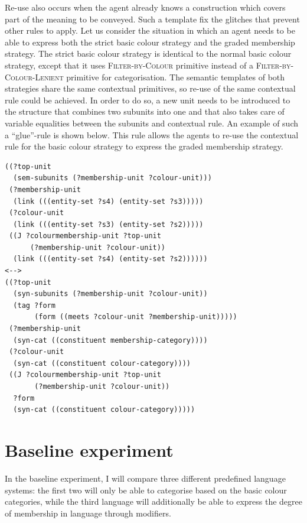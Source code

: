 Re-use also occurs when the agent already knows a construction which
covers part of the meaning to be conveyed. Such a template fix the
glitches that prevent other rules to apply. Let us consider the
situation in which an agent needs to be able to express both the
strict basic colour strategy and the graded membership
  strategy. The strict basic colour strategy is identical to the
normal basic colour strategy, except that it uses
\textsc{Filter-by-Colour} primitive instead of a
\textsc{Filter-by-Colour-Lenient} primitive for categorisation.  The
semantic templates of both strategies share the same contextual
primitives, so re-use of the same contextual rule could be achieved. In
order to do so, a new unit needs to be introduced to the structure
that combines two subunits into one and that also takes care of
variable equalities between the subunits and contextual rule. An
example of such a ``glue''-rule is shown below. This rule allows the
agents to re-use the contextual rule for the basic colour
  strategy to express the graded membership strategy.

\footnotesize
\begin{Verbatim}[frame=lines, label=ColourMembership rule]
((?top-unit 
  (sem-subunits (?membership-unit ?colour-unit)))
 (?membership-unit 
  (link (((entity-set ?s4) (entity-set ?s3)))))
 (?colour-unit 
  (link (((entity-set ?s3) (entity-set ?s2)))))
 ((J ?colourmembership-unit ?top-unit 
      (?membership-unit ?colour-unit))
  (link (((entity-set ?s4) (entity-set ?s2))))))
<-->
((?top-unit
  (syn-subunits (?membership-unit ?colour-unit))
  (tag ?form 
       (form ((meets ?colour-unit ?membership-unit)))))
 (?membership-unit
  (syn-cat ((constituent membership-category))))
 (?colour-unit 
  (syn-cat ((constituent colour-category))))
 ((J ?colourmembership-unit ?top-unit 
       (?membership-unit ?colour-unit))
  ?form
  (syn-cat ((constituent colour-category)))))
\end{Verbatim}
\normalsize


\section{Baseline experiment}
\label{s:gms-baseline-experiment}

In the baseline experiment, I will compare three different predefined language
systems: the first two will only be able to categorise based on the
basic colour categories, while the third language will additionally be
able to express the degree of membership in language through
modifiers.

